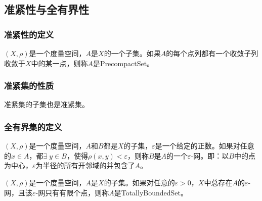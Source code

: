 \subsection{准紧性与全有界性}
\subsubsection{准紧性的定义}
\begin{definition}
	$(X,\rho)$是一个度量空间，$A$是$X$的一个子集。如果$A$的每个点列都有一个收敛子列收敛于$X$中的某一点，则称$A$是\gls{PrecompactSet}。
\end{definition}
\subsubsection{准紧集的性质}
\begin{property}
	准紧集的子集也是准紧集。
\end{property}
\subsubsection{全有界集的定义}
\begin{definition}
	$(X,\rho)$是一个度量空间，$A$和$B$都是$X$的子集，$\varepsilon$是一个给定的正数。如果对任意的$x\in A$，都$\exists\;y\in B$，使得$\rho(x,y)<\varepsilon$，则称$B$是$A$的一个$\varepsilon$-网。即：以$B$中的点为中心，$\varepsilon$为半径的所有开邻域的并包含了$A$。
\end{definition}
\begin{definition}
	$(X,\rho)$是一个度量空间，$A$是$X$的子集。如果对任意的$\varepsilon>0$，$X$中总存在$A$的$\varepsilon$-网，且该$\varepsilon$-网只有有限个点，则称$A$是\gls{TotallyBoundedSet}。
\end{definition}
